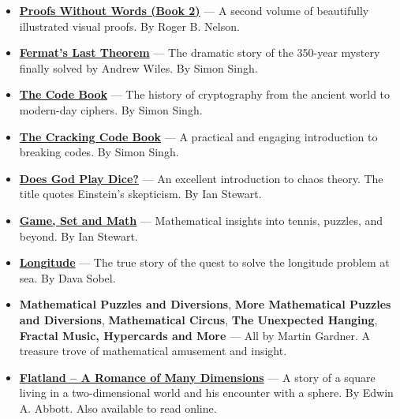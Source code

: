 \documentclass[11pt]{article}
\begin{document}
\begin{itemize}
\item \href{https://isbn.is/0883857219}{\textbf{Proofs Without Words (Book 2)}} — A second volume of beautifully illustrated visual proofs. By Roger B. Nelson.

\item \href{https://isbn.is/1841157910}{\textbf{Fermat’s Last Theorem}} — The dramatic story of the 350-year mystery finally solved by Andrew Wiles. By Simon Singh.

\item \href{https://isbn.is/1857028899}{\textbf{The Code Book}} — The history of cryptography from the ancient world to modern-day ciphers. By Simon Singh.

\item \href{https://isbn.is/000717604X}{\textbf{The Cracking Code Book}} — A practical and engaging introduction to breaking codes. By Simon Singh.

\item \href{https://isbn.is/0140256024}{\textbf{Does God Play Dice?}} — An excellent introduction to chaos theory. The title quotes Einstein’s skepticism. By Ian Stewart.

\item \href{https://isbn.is/0140132376}{\textbf{Game, Set and Math}} — Mathematical insights into tennis, puzzles, and beyond. By Ian Stewart.

\item \href{https://isbn.is/0007214227}{\textbf{Longitude}} — The true story of the quest to solve the longitude problem at sea. By Dava Sobel.

\item \textbf{Mathematical Puzzles and Diversions}, \textbf{More Mathematical Puzzles and Diversions}, \textbf{Mathematical Circus}, \textbf{The Unexpected Hanging}, \textbf{Fractal Music, Hypercards and More} — All by Martin Gardner. A treasure trove of mathematical amusement and insight.

\item \href{http://www.geom.uiuc.edu/~banchoff/Flatland/}{\textbf{Flatland – A Romance of Many Dimensions}} — A story of a square living in a two-dimensional world and his encounter with a sphere. By Edwin A. Abbott. Also available to read online.

\end{itemize}
\end{document}
